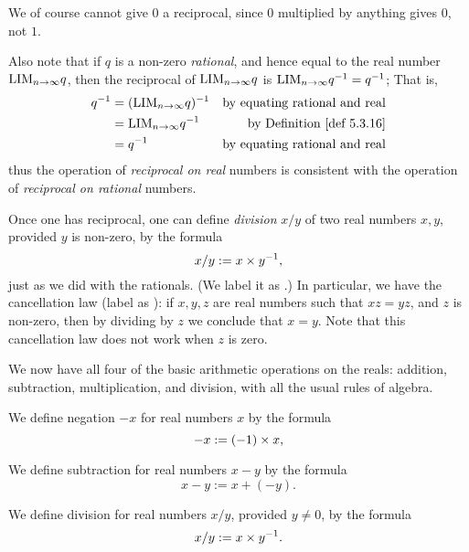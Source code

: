 \begin{note}
We of course cannot give \(0\) a reciprocal, since \(0\) multiplied by anything gives \(0\), not \(1\). 
\end{note}

\begin{note}
Also note that if \(q\) is a non-zero \emph{rational}, and hence equal to the real number \(\text{LIM}_{n \to \infty} q\),
then the reciprocal of \(\text{LIM}_{n \to \infty} q\) is \(\text{LIM}_{n \to \infty} q^{-1} = q^{-1}\);
That is,
\begin{align*}
    q^{-1} & = (\LIM_{n \toINF} q)^{-1} & \text{by equating rational and real} \\
           & = \LIM_{n \toINF} q^{-1} & \text{by \DEF{5.3.16}} \\
           & = q^{-1} & \text{by equating rational and real}
\end{align*}
thus the operation of \emph{reciprocal on real} numbers is consistent with the operation of \emph{reciprocal on rational} numbers.
\end{note}

Once one has reciprocal, one can define \emph{division} \(x/y\) of two real numbers \(x, y\), provided \(y\) is non-zero, by the formula
\[
    x/y := x \times y^{-1},
\]
just as we did with the rationals. (We label it as .)
In particular, we have the cancellation law (label as ): if \(x, y, z\) are real numbers such that \(xz = yz\), and \(z\) is non-zero, then by dividing by \(z\) we conclude that \(x = y\).
Note that this cancellation law does not work when \(z\) is zero.

We now have all four of the basic arithmetic operations on the reals: addition, subtraction, multiplication, and division, with all the usual
rules of algebra.

\begin{definition} \label{def 5.3.18}
We define negation \(-x\) for real numbers \(x\) by the formula
\[
    -x := (-1) \times x,
\]
\end{definition}

\begin{definition} \label{def 5.3.19}
We define subtraction for real numbers \(x - y\) by the formula
\[
    x - y := x + (-y).
\]
\end{definition}

\begin{definition} \label{def 5.3.20}
We define division for real numbers \(x/y\), provided \(y \ne 0\), by the formula
\[
    x/y := x \times y^{-1}.
\]
\end{definition}

